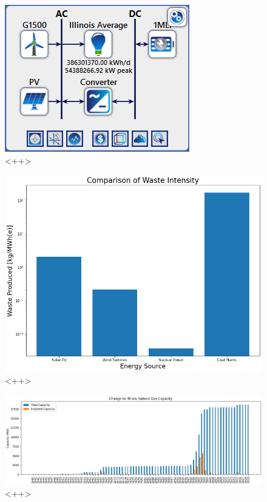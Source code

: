 \begin{figure}[H]
	\centering
	\includegraphics[width=\columnwidth]{./img/homer_system_setup.png}
	\caption{<++>}
	\label{fig:<++>}
\end{figure}


\begin{figure}[H]
	\centering
	\includegraphics[width=\columnwidth]{./img/mass-waste-intensity.png}
	\caption{<++>}
	\label{fig:<++>}
\end{figure}


\begin{figure}[H]
	\centering
	\includegraphics[width=\columnwidth]{./img/annual_installed_cap_natgas.png}
	\caption{<++>}
	\label{fig:<++>}
\end{figure}

